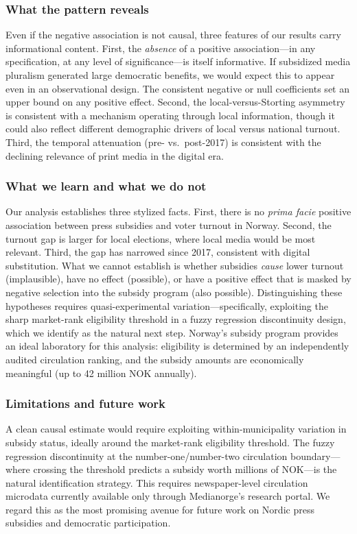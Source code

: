 \documentclass[12pt]{article}
\begin{document}
\subsubsection*{What the pattern reveals} Even if the negative association is not causal, three features of our results carry informational content. First, the \textit{absence} of a positive association---in any specification, at any level of significance---is itself informative. If subsidized media pluralism generated large democratic benefits, we would expect this to appear even in an observational design. The consistent negative or null coefficients set an upper bound on any positive effect. Second, the local-versus-Storting asymmetry is consistent with a mechanism operating through local information, though it could also reflect different demographic drivers of local versus national turnout. Third, the temporal attenuation (pre- vs.\ post-2017) is consistent with the declining relevance of print media in the digital era.

\subsubsection*{What we learn and what we do not} Our analysis establishes three stylized facts. First, there is no \textit{prima facie} positive association between press subsidies and voter turnout in Norway. Second, the turnout gap is larger for local elections, where local media would be most relevant. Third, the gap has narrowed since 2017, consistent with digital substitution. What we cannot establish is whether subsidies \textit{cause} lower turnout (implausible), have no effect (possible), or have a positive effect that is masked by negative selection into the subsidy program (also possible). Distinguishing these hypotheses requires quasi-experimental variation---specifically, exploiting the sharp market-rank eligibility threshold in a fuzzy regression discontinuity design, which we identify as the natural next step. Norway's subsidy program provides an ideal laboratory for this analysis: eligibility is determined by an independently audited circulation ranking, and the subsidy amounts are economically meaningful (up to 42 million NOK annually).

\subsubsection*{Limitations and future work} A clean causal estimate would require exploiting within-municipality variation in subsidy status, ideally around the market-rank eligibility threshold. The fuzzy regression discontinuity at the number-one/number-two circulation boundary---where crossing the threshold predicts a subsidy worth millions of NOK---is the natural identification strategy. This requires newspaper-level circulation microdata currently available only through Medianorge's research portal. We regard this as the most promising avenue for future work on Nordic press subsidies and democratic participation.
\end{document}
